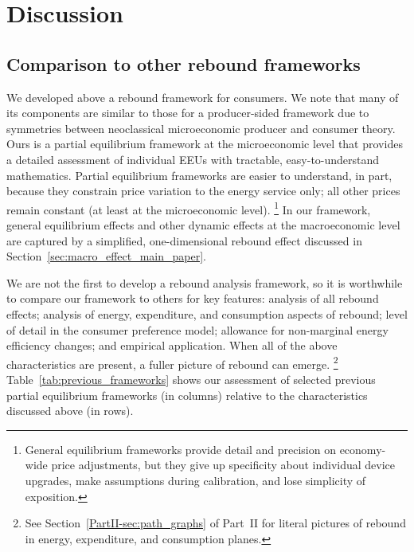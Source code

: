\documentclass[12pt]{article}\usepackage[]{graphicx}\usepackage[]{xcolor}
\begin{document}
\section{Discussion}
\label{sec:discussion}


\subsection{Comparison to other rebound frameworks}
\label{sec:comparison_to_other_rebound_frameworks}

We developed above a rebound framework for consumers. 
We note that many of its components are similar
to those for a producer-sided framework
due to symmetries between
neoclassical microeconomic producer and consumer theory.
Ours is a partial equilibrium framework at the microeconomic level
that provides a detailed assessment of individual EEUs with tractable,
easy-to-understand mathematics.
Partial equilibrium frameworks are easier to understand, in part, because
they constrain price variation to the energy service only; 
all other prices remain constant
(at least at the microeconomic level).%
\footnote{
  General equilibrium frameworks provide detail and precision
  on economy-wide price adjustments, but
  they give up specificity about individual device upgrades, 
  make assumptions during calibration, and 
  lose simplicity of exposition.
}
%
In our framework, 
general equilibrium effects and other dynamic effects 
at the macroeconomic level are captured by 
a simplified, one-dimensional rebound effect
discussed in Section~\ref{sec:macro_effect_main_paper}.

We are not the first to develop a rebound analysis framework,
so it is worthwhile to compare our framework to others
for key features: 
analysis of all rebound effects; 
analysis of energy, expenditure, and consumption aspects of rebound; 
level of detail in the consumer preference model;
allowance for non-marginal energy efficiency changes; and 
empirical application.
When all of the above characteristics are present, 
a fuller picture of rebound can emerge.%
\footnote{
  See Section~\ref{PartII-sec:path_graphs} of Part~II for literal pictures of rebound in 
  energy, expenditure, and consumption planes.
}
%
Table~\ref{tab:previous_frameworks} shows our assessment
of selected previous partial equilibrium frameworks (in columns)
relative to the characteristics discussed above (in rows).
\end{document}
